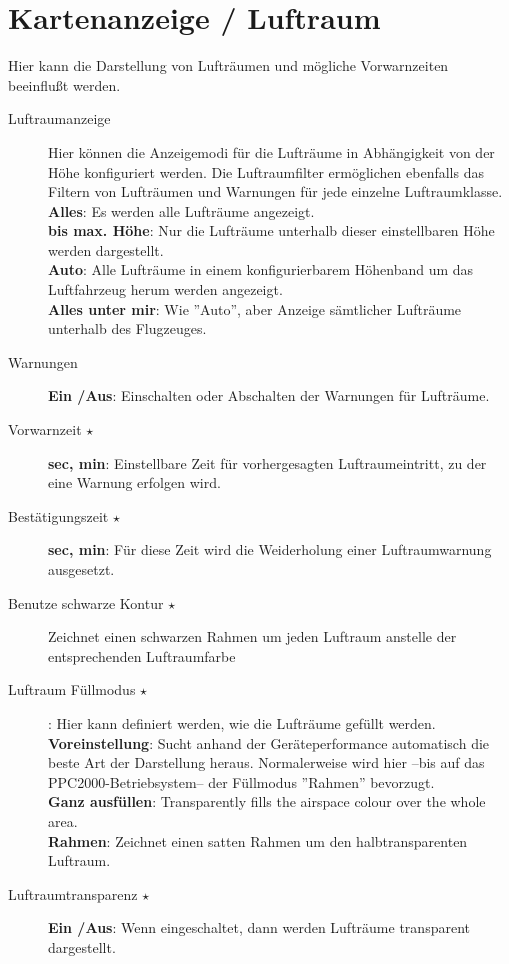 \section{Kartenanzeige / Luftraum}\label{sec:airspace-display}

Hier kann die Darstellung von Lufträumen und mögliche Vorwarnzeiten
 beeinflußt werden.

\begin{description}
\item[Luftraumanzeige]  Hier können die Anzeigemodi für die Lufträume in
Abhängigkeit von der Höhe konfiguriert werden.
Die Luftraumfilter ermöglichen ebenfalls das Filtern von Lufträumen und Warnungen für jede
einzelne Luftraumklasse. \\
  {\bf Alles}: Es werden alle Lufträume angezeigt.\\
  {\bf bis max. Höhe}: Nur die Lufträume unterhalb dieser einstellbaren Höhe werden dargestellt.\\
  {\bf Auto}: Alle Lufträume in einem konfigurierbarem Höhenband um das Luftfahrzeug herum werden angezeigt.
 \\
  {\bf Alles unter mir}:  Wie ''Auto'', aber Anzeige sämtlicher Lufträume unterhalb des Flugzeuges.
\item[Warnungen]  {\bf Ein /Aus}:  Einschalten oder Abschalten der Warnungen für Lufträume.
\item[Vorwarnzeit $\star$]  {\bf sec, min}: Einstellbare Zeit für vorhergesagten Luftraumeintritt, zu der eine Warnung erfolgen wird.
\item[Bestätigungszeit $\star$]  {\bf sec, min}: Für diese Zeit wird die Weiderholung einer Luftraumwarnung ausgesetzt.
\item[Benutze schwarze Kontur $\star$] Zeichnet einen schwarzen Rahmen um jeden Luftraum anstelle der entsprechenden Luftraumfarbe
\item[Luftraum Füllmodus $\star$]  {\bf }:  Hier kann definiert werden, wie die Lufträume gefüllt werden.\\
   {\bf Voreinstellung}: Sucht anhand der Geräteperformance automatisch die beste Art der Darstellung heraus.
    Normalerweise wird hier --bis auf das PPC2000-Betriebsystem-- der Füllmodus ''Rahmen'' bevorzugt.\\
    {\bf Ganz ausfüllen}:  Transparently fills the airspace colour over the whole area. \\
    {\bf Rahmen}: Zeichnet einen satten Rahmen um den halbtransparenten Luftraum. \\
\item[Luftraumtransparenz $\star$]  {\bf Ein /Aus}: Wenn eingeschaltet, dann werden Lufträume transparent dargestellt.
\end{description}


